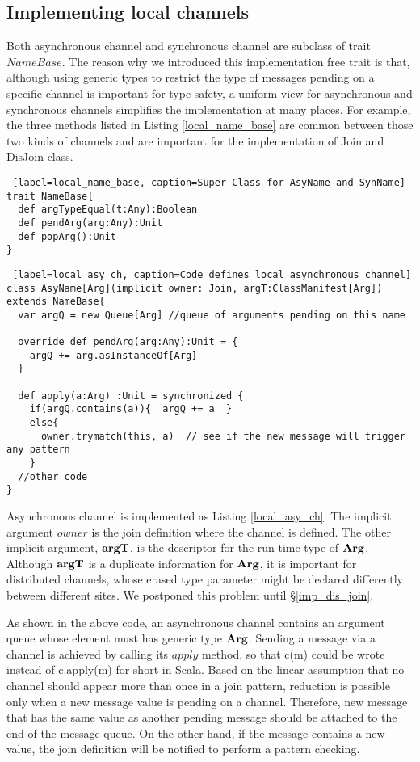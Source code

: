 \newpage
\subsection{Implementing local channels}
\label{imp_loc_join}
Both asynchronous channel and synchronous channel are subclass of trait $NameBase$.  The reason why we introduced this implementation free trait is that, although using generic types to restrict the type of messages pending on a specific channel is important for type safety, a uniform view for asynchronous and synchronous channels simplifies the implementation at many places.  For example, the three methods listed in Listing \ref{local_name_base} are common between those two kinds of channels and are important for the implementation of Join and DisJoin class.

\begin{lstlisting} [label=local_name_base, caption=Super Class for AsyName and SynName]
trait NameBase{  
  def argTypeEqual(t:Any):Boolean
  def pendArg(arg:Any):Unit
  def popArg():Unit
}
\end{lstlisting}

\begin{lstlisting} [label=local_asy_ch, caption=Code defines local asynchronous channel]
class AsyName[Arg](implicit owner: Join, argT:ClassManifest[Arg]) extends NameBase{
  var argQ = new Queue[Arg] //queue of arguments pending on this name

  override def pendArg(arg:Any):Unit = {
    argQ += arg.asInstanceOf[Arg]
  }

  def apply(a:Arg) :Unit = synchronized { 
    if(argQ.contains(a)){  argQ += a  }
    else{
      owner.trymatch(this, a)  // see if the new message will trigger any pattern
    }
  //other code
}
\end{lstlisting}

Asynchronous channel is implemented as Listing \ref{local_asy_ch}.  The implicit argument $owner$ is the join definition where the channel is defined.  The other implicit argument, $\bf{argT}$, is the descriptor for the run time type of $\bf{Arg}$.  Although $\bf{argT}$ is a duplicate information for $\bf{Arg}$, it is important for distributed channels, whose erased type parameter might be declared differently between different sites.  We postponed this problem until  \S\ref{imp_dis_join}.

As shown in the above code, an asynchronous channel contains an argument queue whose element must has generic type $\bf{Arg}$.  Sending a message via a channel is achieved by calling its $apply$ method, so that c(m) could be wrote instead of c.apply(m) for short in Scala.   Based on the linear assumption that no channel should appear more than once in a join pattern, reduction is possible only when a new message value is pending on a channel.  Therefore, new message that has the same value as another pending message should be attached to the end of the message queue.  On the other hand, if the message contains a new value, the join definition will be notified to perform a pattern checking.

